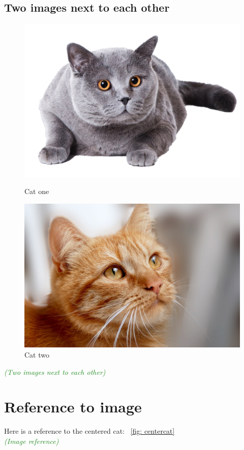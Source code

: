 \documentclass{article}
\newcommand{\ccheck}[1]{\textcolor{ForestGreen}{\emph{(\checkmark #1)}}} %
\begin{document}
\subsection{Two images next to each other}
\begin{figure}[H]
    \centering
    \begin{minipage}[b]{0.4\textwidth}
      \includegraphics[width=\textwidth, angle=315]{catpng}
      \caption{Cat one}
    \end{minipage}
    \hfill
    \begin{minipage}[b]{0.4\textwidth}
      \includegraphics[width=\textwidth, angle=45]{cat.jpg}
      \caption{Cat two}
    \end{minipage}
  \end{figure}
  \ccheck{Two images next to each other}

\section{Reference to image}
Here is a reference to the centered cat: ~\ref{fig: centercat}\\
\ccheck{Image reference}
\end{document}
